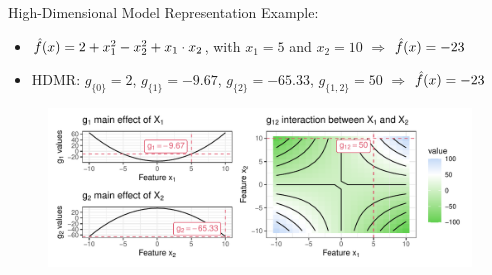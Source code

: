 \documentclass[11pt,compress,t,notes=noshow, aspectratio=169, xcolor=table]{beamer}
\newcommand{\open}{\{}
\newcommand{\close}{\}}
\begin{document}
\begin{frame}{High-Dimensional Model Representation}
Example:

\begin{itemize}
    \item $\fh(x) = 2 + x_1^2 - x_2^2 + x_1 \cdot x_2$, with $x_1 = 5$ and $x_2 = 10$ $\Rightarrow$ $\fh(x) = -23$
    \item HDMR: $g_{\open 0 \close} = 2$, $g_{\open 1 \close} = -9.67$, $g_{\open 2 \close} = -65.33$, $g_{\open 1,2 \close} = 50$ $\Rightarrow$ $\fh(x) = -23$
\end{itemize} 

\begin{figure}
\includegraphics[width = 0.7 \textwidth]{figure/interaction2}
\end{figure}
\end{frame}


\end{document}
